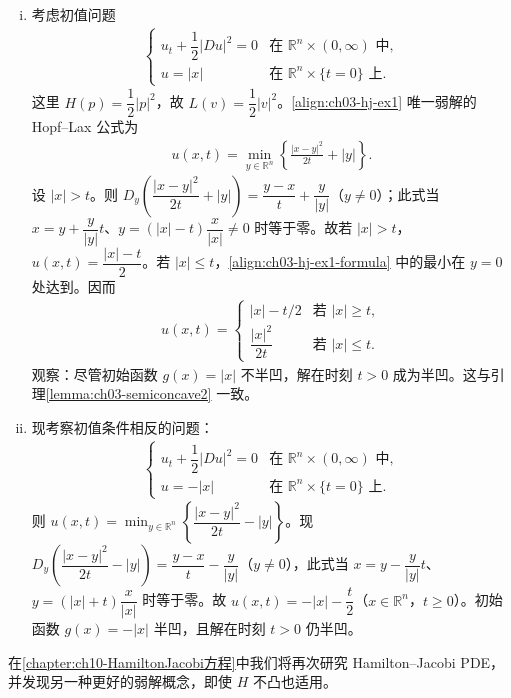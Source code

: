 \documentclass[../../main.tex]{subfiles}
\begin{document}
\begin{examples}\label{examples:ch03-hj}
\begin{enumerate}[(i)]
\item 考虑初值问题
\begin{align}\label{align:ch03-hj-ex1}
\begin{cases}
u_t+\dfrac{1}{2}|Du|^2=0 & \text{在 }\mathbb{R}^n\times(0,\infty)\text{ 中},\\
u=|x| & \text{在 }\mathbb{R}^n\times\{t=0\}\text{ 上}.
\end{cases}
\end{align}
这里 $H(p)=\dfrac{1}{2}|p|^2$，故 $L(v)=\dfrac{1}{2}|v|^2$。\eqref{align:ch03-hj-ex1} 唯一弱解的 Hopf--Lax 公式为
\begin{align}\label{align:ch03-hj-ex1-formula}
u(x,t)=\min_{y\in\mathbb{R}^n}\left\{\frac{|x-y|^2}{2t}+|y|\right\}.
\end{align}
设 $|x|>t$。则 $D_y\!\left(\dfrac{|x-y|^2}{2t}+|y|\right)=\dfrac{y-x}{t}+\dfrac{y}{|y|}$（$y\neq 0$）；此式当 $x=y+\dfrac{y}{|y|}t$、$y=(|x|-t)\dfrac{x}{|x|}\neq 0$ 时等于零。故若 $|x|>t$，$u(x,t)=\dfrac{|x|-t}{2}$。若 $|x|\leqslant t$，\eqref{align:ch03-hj-ex1-formula} 中的最小在 $y=0$ 处达到。因而
\begin{align*}
u(x,t)=
\begin{cases}
|x|-t/2 & \text{若 }|x|\geqslant t,\\
\dfrac{|x|^2}{2t} & \text{若 }|x|\leqslant t.
\end{cases}
\end{align*}
观察：尽管初始函数 $g(x)=|x|$ 不半凹，解在时刻 $t>0$ 成为半凹。这与引理\cref{lemma:ch03-semiconcave2} 一致。

\item 现考察初值条件相反的问题：
\begin{align}\label{align:ch03-hj-ex2}
\begin{cases}
u_t+\dfrac{1}{2}|Du|^2=0 & \text{在 }\mathbb{R}^n\times(0,\infty)\text{ 中},\\
u=-|x| & \text{在 }\mathbb{R}^n\times\{t=0\}\text{ 上}.
\end{cases}
\end{align}
则 $u(x,t)=\min_{y\in\mathbb{R}^n}\left\{\dfrac{|x-y|^2}{2t}-|y|\right\}$。现 $D_y\!\left(\dfrac{|x-y|^2}{2t}-|y|\right)=\dfrac{y-x}{t}-\dfrac{y}{|y|}$（$y\neq 0$），此式当 $x=y-\dfrac{y}{|y|}t$、$y=(|x|+t)\dfrac{x}{|x|}$ 时等于零。故 $u(x,t)=-|x|-\dfrac{t}{2}$（$x\in\mathbb{R}^n$，$t\geqslant 0$）。初始函数 $g(x)=-|x|$ 半凹，且解在时刻 $t>0$ 仍半凹。
\end{enumerate}
\end{examples}

在\cref{chapter:ch10-HamiltonJacobi方程}中我们将再次研究 Hamilton--Jacobi PDE，并发现另一种更好的弱解概念，即使 $H$ 不凸也适用。
\end{document}
